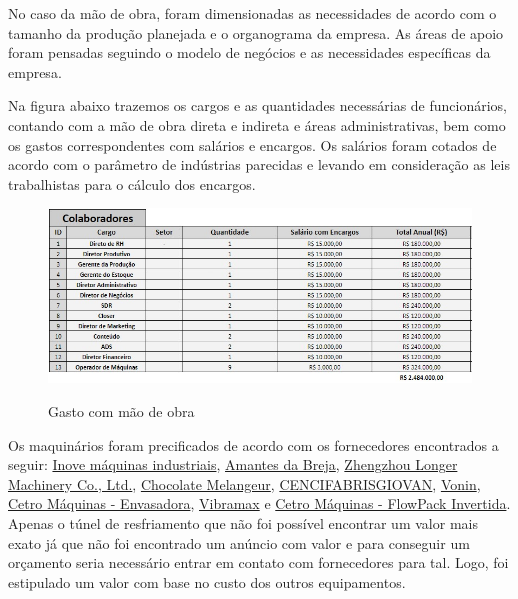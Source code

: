 \documentclass[
	12pt,				%
	openright,			%
	oneside,			%
	a4paper,			%
	english,			%
	french,				%
	spanish,			%
	brazil				%
	]{abntex2}
\begin{document}
No caso da mão de obra, foram dimensionadas as necessidades de acordo com o tamanho da produção planejada e o organograma da empresa. As áreas de apoio foram pensadas seguindo o modelo de negócios e as necessidades específicas da empresa.

Na figura abaixo trazemos os cargos e as quantidades necessárias de funcionários, contando com a mão de obra direta e indireta e áreas administrativas, bem como os gastos correspondentes com salários e encargos. Os salários foram cotados de acordo com o parâmetro de indústrias parecidas e levando em consideração as leis trabalhistas para o cálculo dos encargos.


\begin{figure}[H]
\begin{center}
\caption{Gasto com mão de obra}
\includegraphics[scale=0.6]{4.jpeg} 
\label{-}
\end{center}
\end{figure}


Os maquinários foram precificados de acordo com os fornecedores encontrados a seguir: \href{https://produto.mercadolivre.com.br/MLB-1192701220-torrador-de-cafe-20kg-_JM}{Inove máquinas industriais}, \href{https://www.amantesdabreja.com.br/moagem/linha-chocolate/moedor-de-amendoas/moedor-de-amendoa}{Amantes da Breja}, \href{https://www.alibaba.com/product-detail/Bean-Peeling-Machine-Cocoa-High-Efficient_60773326020.html?spm=a2700.galleryofferlist.normal_offer.d_title.25d053aallo5ha&s=p}{Zhengzhou Longer Machinery Co., Ltd.}, \href{https://www.chocolatemelangeur.com/electra-pro-100-chocolate-melanger}{Chocolate Melangeur}, \href{https://produto.mercadolivre.com.br/MLB-2749274426-derretedeira-industrial-de-chocolate-50-kg-_JM}{CENCIFABRISGIOVAN}, \href{https://produto.mercadolivre.com.br/MLB-2825324737-temperadeira-ruby5-vonin-_JM#position=3&search_layout=stack&type=item&tracking_id=fc20b8e8-f800-435c-994e-4cdf057fb40a}{Vonin}, \href{https://www.cetro.com.br/envasadora-de-produtos-pastosos-2-bicos-cetro-1000-5000ml/p}{Cetro Máquinas - Envasadora}, \href{https://www.vibramax.com.br/mesa-vibratoria}{Vibramax} e \href{https://www.cetro.com.br/flow-pack-invertida-cfpm-280-i/p}{Cetro Máquinas - FlowPack Invertida}. Apenas o túnel de resfriamento que não foi possível encontrar um valor mais exato já que não foi encontrado um anúncio com valor e para conseguir um orçamento seria necessário entrar em contato com fornecedores para tal. Logo, foi estipulado um valor com base no custo dos outros equipamentos.
\end{document}
